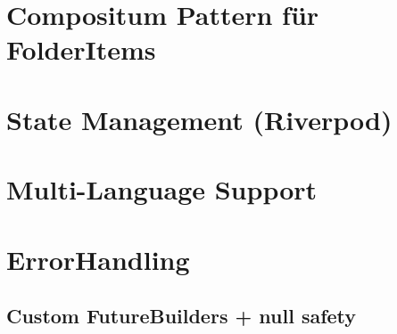 \section{Compositum Pattern für FolderItems}


\section{State Management (Riverpod)}


\section{Multi-Language Support}


\section{ErrorHandling}


\subsection{Custom FutureBuilders + null safety}
